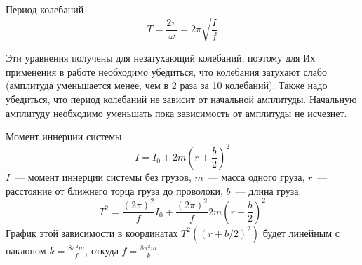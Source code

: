 Период колебаний
\[T=\frac{2\pi}{\omega}=2\pi\sqrt{\frac{I}{f}}\]

Эти уравнения получены для незатухающий колебаний, поэтому для Их
применения в работе необходимо убедиться, что колебания затухают слабо
(амплитуда уменьшается менее, чем в 2 раза за 10 колебаний). Также
надо убедиться, что период колебаний не зависит от начальной амплитуды.
Начальную амплитуду необходимо уменьшать пока зависимость от амплитуды
не исчезнет.

Момент иннерции системы
\[I=I_0+2m\left(r+\frac{b}{2}\right)^2\]
$I$~--- момент иннерции системы без грузов, $m$~--- масса одного груза,
$r$~--- расстояние от ближнего торца груза до проволоки, $b$~--- длина груза.
\[T^2=\frac{\left(2\pi\right)^2}{f}I_0 + \frac{\left(2\pi\right)^2}{f}2m\left(r+\frac{b}{2}\right)^2\]
График этой зависимости в координатах $T^2\left(\left(r+b/2\right)^2\right)$ будет линейным
с наклоном $k=\frac{8\pi^2m}{f}$, откуда $f=\frac{8\pi^2m}{k}$.
